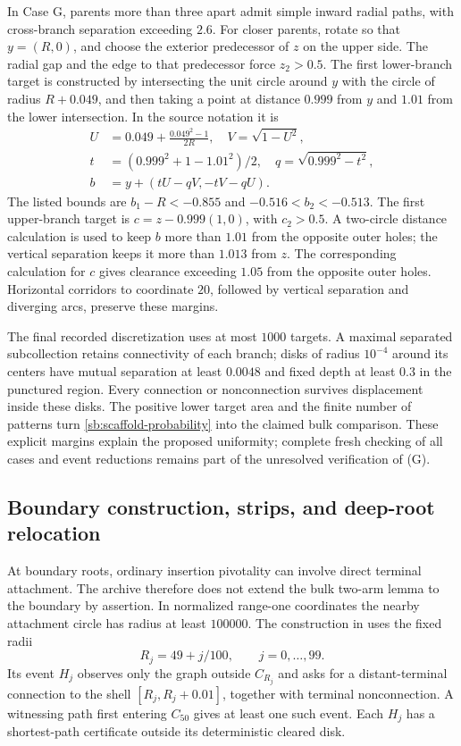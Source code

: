 \documentclass[11pt,a4paper]{article}
\theoremstyle{definition}
\theoremstyle{remark}
\numberwithin{equation}{section}
\begin{document}
In Case G, parents more than three apart admit simple inward radial
paths, with cross-branch separation exceeding $2.6$. For closer
parents, rotate so that $y=(R,0)$, and choose the exterior predecessor
of $z$ on the upper side. The radial gap and the edge to that
predecessor force $z_2>0.5$. The first lower-branch target is constructed
by intersecting the unit circle around $y$ with the circle of radius
$R+0.049$, and then taking a point at distance $0.999$ from $y$ and
$1.01$ from the lower intersection. In the source notation it is
\begin{align*}
 U&=0.049+\frac{0.049^2-1}{2R},\quad V=\sqrt{1-U^2},\\
 t&=(0.999^2+1-1.01^2)/2,\quad q=\sqrt{0.999^2-t^2},\\
 b&=y+(tU-qV,-tV-qU).
\end{align*}
The listed bounds are
$b_1-R<-0.855$ and $-0.516<b_2<-0.513$.
The first upper-branch target is $c=z-0.999(1,0)$, with
$c_2>0.5$. A two-circle distance calculation is used to keep $b$
more than $1.01$ from the opposite outer holes; the vertical separation
keeps it more than $1.013$ from $z$. The corresponding calculation for
$c$ gives clearance exceeding $1.05$ from the opposite outer holes.
Horizontal corridors to coordinate $20$, followed by vertical
separation and diverging arcs, preserve these margins.

The final recorded discretization uses at most $1000$ targets. A
maximal separated subcollection retains connectivity of each branch;
disks of radius $10^{-4}$ around its centers have mutual separation
at least $0.0048$ and fixed depth at least $0.3$ in the punctured
region. Every connection or nonconnection survives displacement
inside these disks. The positive lower target area and the finite
number of patterns turn \eqref{sb:scaffold-probability} into the
claimed bulk comparison. These explicit margins explain the proposed
uniformity; complete fresh checking of all cases and event reductions
remains part of the unresolved verification of (G).

\subsection{Boundary construction, strips, and deep-root relocation}

At boundary roots, ordinary insertion pivotality can involve direct
terminal attachment. The archive therefore does not extend the bulk
two-arm lemma to the boundary by assertion. In normalized range-one
coordinates the nearby attachment circle has radius at least
$100000$. The construction in
 uses the fixed radii
\[
 R_j=49+j/100,\qquad j=0,\ldots,99.
\]
Its event $H_j$ observes only the graph outside $C_{R_j}$ and asks for
a distant-terminal connection to the shell
$[R_j,R_j+0.01]$, together with terminal nonconnection. A witnessing
path first entering $C_{50}$ gives at least one such event. Each $H_j$
has a shortest-path certificate outside its deterministic cleared disk.
\end{document}
